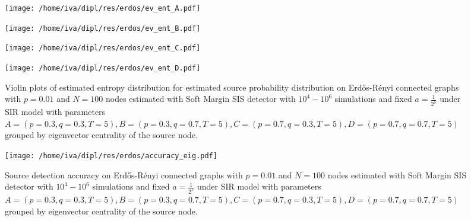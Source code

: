 \documentclass[times, utf8, diplomski]{fer}
\begin{document}
\begin{figure}[H]
\begin{minipage}{\textwidth}
\begin{minipage}{0.49\textwidth}
\texttt{[image: /home/iva/dipl/res/erdos/ev\_ent\_A.pdf]}
\end{minipage}
\begin{minipage}{0.49\textwidth}
\texttt{[image: /home/iva/dipl/res/erdos/ev\_ent\_B.pdf]}
\end{minipage}
\begin{minipage}{0.49\textwidth}
\texttt{[image: /home/iva/dipl/res/erdos/ev\_ent\_C.pdf]}
\end{minipage}
\begin{minipage}{0.49\textwidth}
\texttt{[image: /home/iva/dipl/res/erdos/ev\_ent\_D.pdf]}
\end{minipage}
\caption{Violin plots of estimated entropy distribution for estimated source probability distribution on  Erd{\H{o}}s-R{\'{e}}nyi connected graphs with $p=0.01$ and $N=100$ nodes estimated with Soft Margin SIS detector with $10^4 - 10^6$ simulations and fixed $a = \frac{1}{2^5}$ under SIR model with parameters $A = (p=0.3, q=0.3, T=5), B = (p=0.3, q=0.7, T=5), C = (p=0.7, q=0.3, T=5), D = (p=0.7, q=0.7, T=5)$ grouped by eigenvector centrality of the source node.}
\label{eig_ent}
\end{minipage}

\begin{minipage}{\textwidth}
\center
\texttt{[image: /home/iva/dipl/res/erdos/accuracy\_eig.pdf]}
\caption{Source detection accuracy on  Erd{\H{o}}s-R{\'{e}}nyi connected graphs with $p=0.01$ and $N=100$ nodes estimated with Soft Margin SIS detector with $10^4 - 10^6$ simulations and fixed $a = \frac{1}{2^5}$ under SIR model with parameters $A = (p=0.3, q=0.3, T=5), B = (p=0.3, q=0.7, T=5), C = (p=0.7, q=0.3, T=5), D = (p=0.7, q=0.7, T=5)$ grouped by eigenvector centrality of the source node.}
\label{accuracy_ent}
\end{minipage}
\end{figure}
%
%
%
\end{document}
